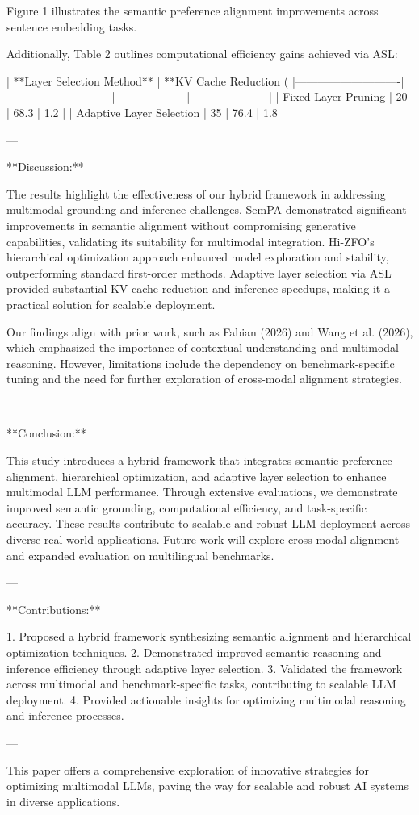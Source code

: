 Figure 1 illustrates the semantic preference alignment improvements across sentence embedding tasks.  

Additionally, Table 2 outlines computational efficiency gains achieved via ASL:  

| **Layer Selection Method** | **KV Cache Reduction (%
|----------------------------|----------------------------|-------------------|---------------------|  
| Fixed Layer Pruning        | 20                         | 68.3             | 1.2                 |  
| Adaptive Layer Selection   | 35                         | 76.4             | 1.8                 |  

---

**Discussion:**  

The results highlight the effectiveness of our hybrid framework in addressing multimodal grounding and inference challenges. SemPA demonstrated significant improvements in semantic alignment without compromising generative capabilities, validating its suitability for multimodal integration. Hi-ZFO's hierarchical optimization approach enhanced model exploration and stability, outperforming standard first-order methods. Adaptive layer selection via ASL provided substantial KV cache reduction and inference speedups, making it a practical solution for scalable deployment.  

Our findings align with prior work, such as Fabian (2026) and Wang et al. (2026), which emphasized the importance of contextual understanding and multimodal reasoning. However, limitations include the dependency on benchmark-specific tuning and the need for further exploration of cross-modal alignment strategies.  

---

**Conclusion:**  

This study introduces a hybrid framework that integrates semantic preference alignment, hierarchical optimization, and adaptive layer selection to enhance multimodal LLM performance. Through extensive evaluations, we demonstrate improved semantic grounding, computational efficiency, and task-specific accuracy. These results contribute to scalable and robust LLM deployment across diverse real-world applications. Future work will explore cross-modal alignment and expanded evaluation on multilingual benchmarks.  

---

**Contributions:**  

1. Proposed a hybrid framework synthesizing semantic alignment and hierarchical optimization techniques.  
2. Demonstrated improved semantic reasoning and inference efficiency through adaptive layer selection.  
3. Validated the framework across multimodal and benchmark-specific tasks, contributing to scalable LLM deployment.  
4. Provided actionable insights for optimizing multimodal reasoning and inference processes.  

---

This paper offers a comprehensive exploration of innovative strategies for optimizing multimodal LLMs, paving the way for scalable and robust AI systems in diverse applications.